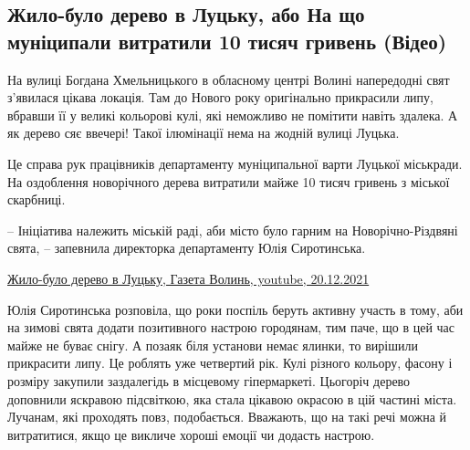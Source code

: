 
 
 
 
 
\subsection{Жило-було дерево в Луцьку, або На що муніципали витратили 10 тисяч гривень (Відео)}
\label{sec:21_12_2021.stz.news.ua.volyn.1.derevo_luck}


На вулиці Богдана Хмельницького в обласному центрі Волині напередодні свят
з’явилася цікава локація. Там до Нового року оригінально прикрасили липу,
вбравши її у великі кольорові кулі, які неможливо не помітити навіть здалека. А
як дерево сяє ввечері! Такої ілюмінації нема на жодній вулиці Луцька.

Це справа рук працівників департаменту муніципальної варти Луцької міськради.
На оздоблення новорічного дерева витратили майже 10 тисяч гривень з міської
скарбниці. 

– Ініціатива належить міській раді, аби місто було гарним на Новорічно-Різдвяні
свята, – запевнила директорка департаменту Юлія Сиротинська.

\href{https://www.youtube.com/watch?v=h9WP7jlec0M}{%
Жило-було дерево в Луцьку, Газета Волинь, youtube, 20.12.2021%
}


Юлія Сиротинська розповіла, що роки поспіль беруть активну участь в тому, аби
на зимові свята додати позитивного настрою городянам, тим паче, що в цей час
майже не буває снігу. А позаяк біля установи немає ялинки, то вирішили
прикрасити липу. Це роблять уже четвертий рік. Кулі різного кольору, фасону і
розміру закупили заздалегідь в місцевому гіпермаркеті. Цьогоріч дерево
доповнили яскравою підсвіткою, яка стала цікавою окрасою в цій частині міста.
Лучанам, які проходять повз, подобається. Вважають, що на такі речі можна й
витратитися, якщо це викличе хороші емоції чи додасть настрою.

